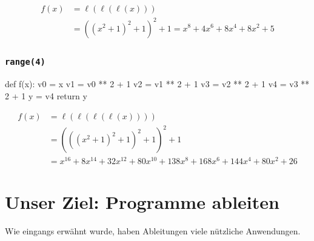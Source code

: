 \documentclass[
  letterpaper,
  DIV=11,
  oneside]{scrreprt}
\newenvironment{Shaded}{\begin{snugshade}}{\end{snugshade}}
\newcommand{\ControlFlowTok}[1]{\textcolor[rgb]{0.00,0.23,0.31}{#1}}
\newcommand{\DecValTok}[1]{\textcolor[rgb]{0.68,0.00,0.00}{#1}}
\newcommand{\KeywordTok}[1]{\textcolor[rgb]{0.00,0.23,0.31}{#1}}
\newcommand{\NormalTok}[1]{\textcolor[rgb]{0.00,0.23,0.31}{#1}}
\newcommand{\OperatorTok}[1]{\textcolor[rgb]{0.37,0.37,0.37}{#1}}
\theoremstyle{definition}
\theoremstyle{definition}
\theoremstyle{remark}
\begin{document}
\begin{tcolorbox}
\[
\begin{flalign}
    f(x) &= \ell(\ell(\ell(x))) \\
         &= ((x^2 + 1)^2 + 1)^2 + 1 = x^8 + 4x^6 + 8x^4 + 8x^2 + 5
\end{flalign}
\]

\hypertarget{range4}{%
\subsubsection{\texorpdfstring{\texttt{range(4)}}{range(4)}}\label{range4}}

\begin{Shaded}
\begin{Highlighting}[]
\KeywordTok{def}\NormalTok{ f(x):}
\NormalTok{    v0 }\OperatorTok{=}\NormalTok{ x}
\NormalTok{    v1 }\OperatorTok{=}\NormalTok{ v0 }\OperatorTok{**} \DecValTok{2} \OperatorTok{+} \DecValTok{1}
\NormalTok{    v2 }\OperatorTok{=}\NormalTok{ v1 }\OperatorTok{**} \DecValTok{2} \OperatorTok{+} \DecValTok{1}
\NormalTok{    v3 }\OperatorTok{=}\NormalTok{ v2 }\OperatorTok{**} \DecValTok{2} \OperatorTok{+} \DecValTok{1}
\NormalTok{    v4 }\OperatorTok{=}\NormalTok{ v3 }\OperatorTok{**} \DecValTok{2} \OperatorTok{+} \DecValTok{1}
\NormalTok{    y }\OperatorTok{=}\NormalTok{ v4}
    \ControlFlowTok{return}\NormalTok{ y}
\end{Highlighting}
\end{Shaded}

\[
\begin{flalign}
    f(x) &= \ell(\ell(\ell(\ell(x)))) \\
         &= (((x^2 + 1)^2 + 1)^2 + 1)^2 + 1 \\
         &= x^{16} + 8x^{14} + 32x^{12} + 80x^{10} + 138x^8 + 168x^6 + 144x^4 + 80x^2 + 26
\end{flalign}
\]

\end{tcolorbox}

\hypertarget{unser-ziel-programme-ableiten}{%
\section{Unser Ziel: Programme
ableiten}\label{unser-ziel-programme-ableiten}}

Wie eingangs erwähnt wurde, haben Ableitungen viele nützliche
Anwendungen.
\end{document}
